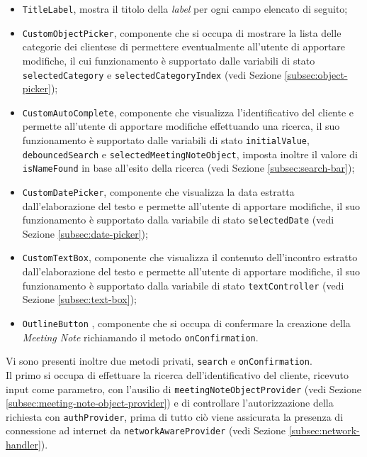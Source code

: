 \begin{itemize}
    \item \lstinline{TitleLabel}, mostra il titolo della \emph{label} per ogni campo elencato di seguito;
    \item \lstinline{CustomObjectPicker}, componente che si occupa di mostrare la lista delle categorie dei \glspl{cliente}\glsoccur e di permettere eventualmente all'utente di apportare modifiche, il cui funzionamento è supportato dalle variabili di stato \lstinline{selectedCategory} e \lstinline{selectedCategoryIndex} (vedi Sezione \ref{subsec:object-picker});
    \item \lstinline{CustomAutoComplete}, componente che visualizza l'identificativo del cliente e permette all'utente di apportare modifiche effettuando una ricerca, il suo funzionamento è supportato dalle variabili di stato \lstinline{initialValue}, \lstinline{debouncedSearch} e \lstinline{selectedMeetingNoteObject}, imposta inoltre il valore di \lstinline{isNameFound} in base all'esito della ricerca (vedi Sezione \ref{subsec:search-bar});
    \item \lstinline{CustomDatePicker}, componente che visualizza la data estratta dall'elaborazione del testo e permette all'utente di apportare modifiche, il suo funzionamento è supportato dalla variabile di stato \lstinline{selectedDate} (vedi Sezione \ref{subsec:date-picker});
    \item \lstinline{CustomTextBox}, componente che visualizza il contenuto dell'incontro estratto dall'elaborazione del testo e permette all'utente di apportare modifiche, il suo funzionamento è supportato dalla variabile di stato \lstinline{textController} (vedi Sezione \ref{subsec:text-box});
    \item \lstinline{OutlineButton} \cite{site:outline-button}, componente che si occupa di confermare la creazione della \emph{Meeting Note} richiamando il metodo \lstinline{onConfirmation}.
\end{itemize}
Vi sono presenti inoltre due metodi privati, \lstinline{search} e \lstinline{onConfirmation}. \\
Il primo si occupa di effettuare la ricerca dell'identificativo del \gls{cliente}\glsoccur, ricevuto input come parametro, con l'ausilio di \lstinline{meetingNoteObjectProvider} (vedi Sezione \ref{subsec:meeting-note-object-provider}) e di controllare l'autorizzazione della richiesta con \lstinline{authProvider}, prima di tutto ciò viene assicurata la presenza di connessione ad internet da \lstinline{networkAwareProvider} (vedi Sezione \ref{subsec:network-handler}). \\
